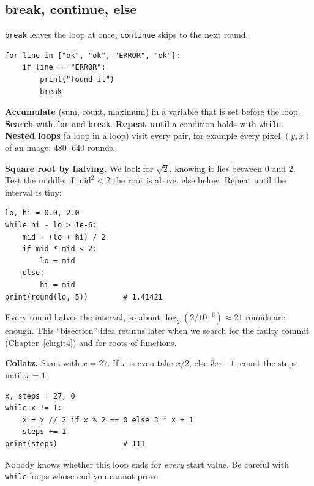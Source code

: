 \subsection*{break, continue, else}
\texttt{break} leaves the loop at once, \texttt{continue} skips to the next round.
\begin{verbatim}
for line in ["ok", "ok", "ERROR", "ok"]:
    if line == "ERROR":
        print("found it")
        break
\end{verbatim}
\begin{keyidea}
\textbf{Accumulate} (sum, count, maximum) in a variable that is set before the loop. \textbf{Search} with \texttt{for} and \texttt{break}. \textbf{Repeat until} a condition holds with \texttt{while}. \textbf{Nested loops} (a loop in a loop) visit every pair, for example every pixel $(y,x)$ of an image: $480\cdot640$ rounds.
\end{keyidea}

\begin{example}
\textbf{Square root by halving.} We look for $\sqrt2$, knowing it lies between $0$ and $2$. Test the middle: if $\text{mid}^2<2$ the root is above, else below. Repeat until the interval is tiny:
\begin{verbatim}
lo, hi = 0.0, 2.0
while hi - lo > 1e-6:
    mid = (lo + hi) / 2
    if mid * mid < 2:
        lo = mid
    else:
        hi = mid
print(round(lo, 5))        # 1.41421
\end{verbatim}
Every round halves the interval, so about $\log_2(2/10^{-6})\approx 21$ rounds are enough. This ``bisection'' idea returns later when we search for the faulty commit (Chapter~\ref{ch:git4}) and for roots of functions.
\end{example}
\begin{example}
\textbf{Collatz.} Start with $x=27$. If $x$ is even take $x/2$, else $3x+1$; count the steps until $x=1$:
\begin{verbatim}
x, steps = 27, 0
while x != 1:
    x = x // 2 if x % 2 == 0 else 3 * x + 1
    steps += 1
print(steps)               # 111
\end{verbatim}
Nobody knows whether this loop ends for \emph{every} start value. Be careful with \texttt{while} loops whose end you cannot prove.
\end{example}

